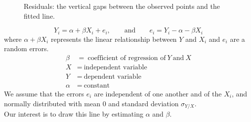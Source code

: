 \documentclass[11pt,a4paper]{article}
\theoremstyle{definition}
\begin{document}

\begin{figure}[H]
\centering
{}
\caption{Residuals: the vertical gaps between the observed points and the fitted line.}
\end{figure}











 
 
 
 
\[Y_i=\alpha +\beta X_i+e_i,\qquad \text{and}\qquad  e_i=Y_i-\alpha -\beta X_i\]
where $\alpha +\beta X_i$ represents the linear relationship between $Y$ and $X_i$ and $e_i$ are a random errors.
\begin{align*}
\beta &=\ \text{coefficient of regression of}\ Y\ \text{and}\ X\\ X&=\ \text{independent variable}\\ Y&=\ \text{dependent variable}\\ \alpha &=\ \text{constant}
\end{align*}
We assume that the errors $e_i$ are independent of one another and of the $X_i$, and normally distributed with mean 0 and standard deviation $\sigma_{Y/X}$.\\[1ex] Our interest is to draw this line by estimating $\alpha$ and $\beta$.\\
\end{document}
